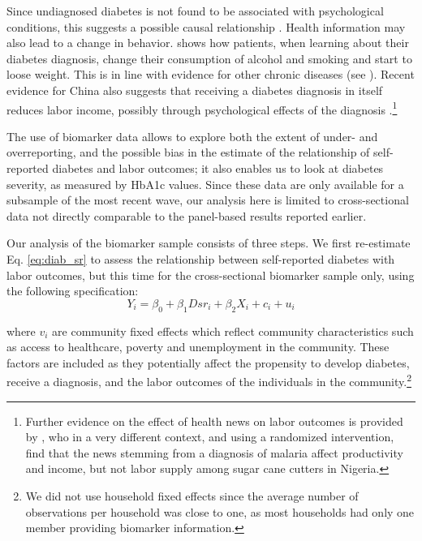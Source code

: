 \documentclass[12pt,english]{article}
\begin{document}
Since undiagnosed diabetes is not found to be associated with psychological conditions, this suggests a possible causal relationship \parencite{Nouwen2011}. Health information may also lead to a change in behavior. \textcite{Slade2012} shows how patients, when learning about their diabetes diagnosis, change their consumption of alcohol and smoking and start to loose weight. This is in line with evidence for other chronic diseases (see \textcite{Baird2014,Gong2015,Thornton2008,Zhao2013a}). 
Recent evidence for China also suggests that receiving a diabetes diagnosis in itself reduces labor income, possibly through psychological effects of the diagnosis \parencite{Liu2014}.\footnote{Further evidence on the effect of health news on labor outcomes is provided by \textcite{Dillon2014}, who in a very different context, and using a randomized intervention, find that the news stemming from a diagnosis of malaria affect productivity and income, but not labor supply among sugar cane cutters in Nigeria.} 


The use of biomarker data allows to explore both the extent of under- and overreporting, and the possible bias in the estimate of the relationship of self-reported diabetes and labor outcomes; it also enables us to look at diabetes severity, as measured by \ac{HbA1c} values. Since these data are only available for a subsample of the most recent wave, our analysis here is limited to cross-sectional data not directly comparable to the panel-based results reported earlier.

Our analysis of the biomarker sample consists of three steps. We first re-estimate Eq. \ref{eq:diab_sr} to assess the relationship between self-reported diabetes with labor outcomes, but this time for the cross-sectional biomarker sample only, using the following specification:
\begin{equation}
Y_{i}=\beta_{0}+\beta_{1}Dsr_{i}+\beta_{2}X_{i}+c_{i}+u_{i}\label{eq:diab_sr}
\end{equation}

where $v_{i}$ are community fixed effects which reflect community characteristics such as access to healthcare, poverty and unemployment in the community. These factors are included as they potentially affect the propensity to develop diabetes, receive a diagnosis, and the labor outcomes of the individuals in the community.\footnote{We did not use household fixed effects since the average number of observations per household was close to one, as most households had only one member providing biomarker information.}
\end{document}
